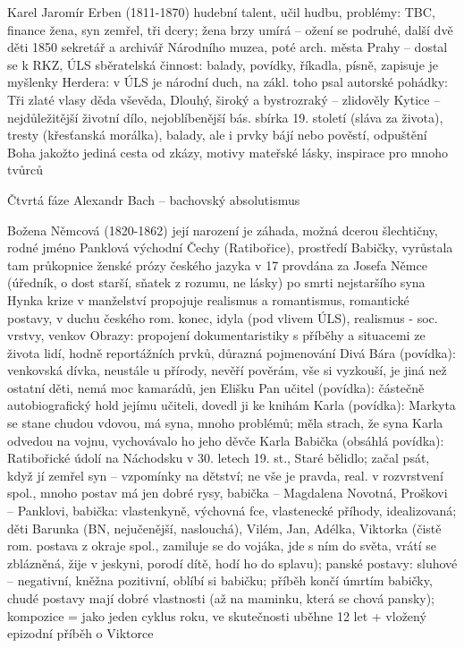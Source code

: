 \documentclass{article}
\begin{document}
Karel Jaromír Erben (1811-1870)
hudební talent, učil hudbu, problémy: TBC, finance
žena, syn zemřel, tři dcery; žena brzy umírá -- ožení se podruhé, další dvě děti
1850 sekretář a archivář Národního muzea, poté arch. města Prahy – dostal se k RKZ, ÚLS
sběratelská činnost: balady, povídky, říkadla, písně, zapisuje je
myšlenky Herdera: v ÚLS je národní duch, na zákl. toho psal autorské pohádky: Tři zlaté vlasy děda vševěda, Dlouhý, široký a bystrozraký -- zlidověly
Kytice – nejdůležitější životní dílo, nejoblíbenější bás. sbírka 19. století (sláva za života), tresty (křesťanská morálka), balady, ale i prvky bájí nebo pověstí, odpuštění Boha jakožto jediná cesta od zkázy, motivy mateřské lásky, inspirace pro mnoho tvůrců

Čtvrtá fáze
Alexandr Bach -- bachovský absolutismus

Božena Němcová (1820-1862)
její narození je záhada, možná dcerou šlechtičny, rodné jméno Panklová
východní Čechy (Ratibořice), prostředí Babičky, vyrůstala tam
průkopnice ženské prózy českého jazyka
v 17 provdána za Josefa Němce (úředník, o dost starší, sňatek z rozumu, ne lásky)
po smrti nejstaršího syna Hynka krize v manželství
propojuje realismus a romantismus, romantické postavy, v duchu českého rom. konec, idyla (pod vlivem ÚLS), realismus - soc. vrstvy, venkov
Obrazy: propojení dokumentaristiky s příběhy a situacemi ze života lidí, hodně reportážních prvků, důrazná pojmenování
Divá Bára (povídka): venkovská dívka, neustále u přírody, nevěří pověrám, vše si vyzkouší, je jiná než ostatní děti, nemá moc kamarádů, jen Elišku
Pan učitel (povídka): částečně autobiografický hold jejímu učiteli, dovedl ji ke knihám
Karla (povídka): Markyta se stane chudou vdovou, má syna, mnoho problémů; měla strach, že syna Karla odvedou na vojnu, vychovávalo ho jeho děvče Karla
Babička (obsáhlá povídka): Ratibořické údolí na Náchodsku v 30. letech 19. st., Staré bělidlo; začal psát, když jí zemřel syn -- vzpomínky na dětství; ne vše je pravda, real. v rozvrstvení spol., mnoho postav má jen dobré rysy, babička – Magdalena Novotná, Proškovi – Panklovi, babička: vlastenkyně, výchovná fce, vlastenecké příhody, idealizovaná; děti Barunka (BN, nejučenější, naslouchá), Vilém, Jan, Adélka, Viktorka (čistě rom. postava z okraje spol., zamiluje se do vojáka, jde s ním do světa, vrátí se zblázněná, žije v jeskyni, porodí dítě, hodí ho do splavu); panské postavy: sluhové – negativní, kněžna pozitivní, oblíbí si babičku; příběh končí úmrtím babičky, chudé postavy mají dobré vlastnosti (až na maminku, která se chová pansky); kompozice = jako jeden cyklus roku, ve skutečnosti uběhne 12 let + vložený epizodní příběh o Viktorce
\end{document}
